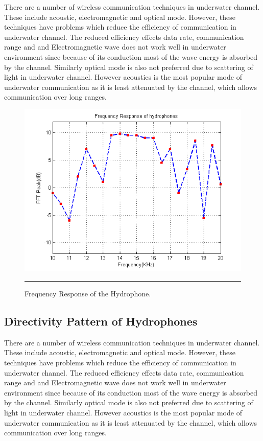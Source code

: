 There are a number of wireless communication techniques in underwater channel. These include acoustic, electromagnetic and optical mode. However, these techniques have problems which reduce the efficiency of communication in underwater channel. The reduced efficiency effects data rate, communication range and and Electromagnetic wave does not work well in underwater environment since because of its conduction most of the wave energy is absorbed by the channel.
Similarly optical mode is also not preferred due to scattering of light in underwater channel.
However acoustics is the most popular mode of underwater communication as it is least attenuated by the channel, which allows communication over long ranges. 
\begin{figure}[htbp]
	\centering
		\includegraphics[width=5in]{Figures/Freq_response.png}
		\rule{35em}{0.5pt}
	\caption[Frequency Response of the Hydrophone]{Frequency Response of the Hydrophone.}
	\label{fig:freq}
\end{figure}

\subsection{Directivity Pattern of Hydrophones }

There are a number of wireless communication techniques in underwater channel. These include acoustic, electromagnetic and optical mode. However, these techniques have problems which reduce the efficiency of communication in underwater channel. The reduced efficiency effects data rate, communication range and and Electromagnetic wave does not work well in underwater environment since because of its conduction most of the wave energy is absorbed by the channel.
Similarly optical mode is also not preferred due to scattering of light in underwater channel.
However acoustics is the most popular mode of underwater communication as it is least attenuated by the channel, which allows communication over long ranges. 

